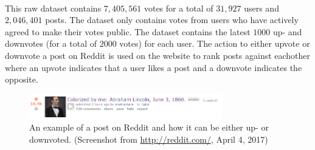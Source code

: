 \\
This raw dataset contains $7,405,561$ votes for a total of $31,927$ users and $ 2,046,401$ posts. The dataset only contains votes from users who have actively agreed to make their votes public. The dataset contains the latest $1000$ up- and downvotes (for a total of $2000$ votes) for each user. The action to either upvote or downvote a post on Reddit is used on the website to rank posts against eachother where an upvote indicates that a user likes a post and a downvote indicates the opposite. 
\begin{figure}[h]
    \centering
    \includegraphics[width=0.75\textwidth]{figure/reddit/reddit_voting}
    \caption{An example of a post on Reddit and how it can be either up- or downvoted. (Screenshot from \url{http://reddit.com/}, April 4, 2017)}
    \label{fig:example_reddit_post}
\end{figure}